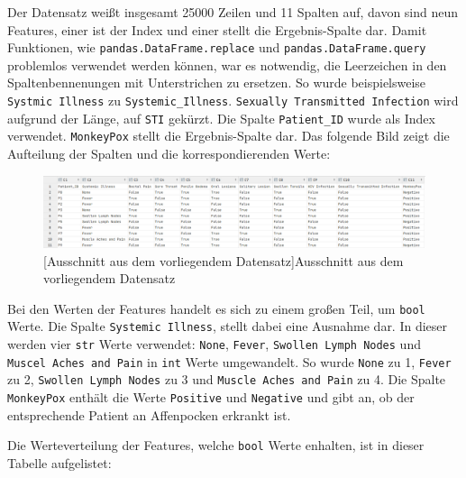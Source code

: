 \documentclass[13pt,a4paper, listof=entryprefix, bibliography=totocnumbered,toc=listofnumbered,lof=listofnumbered]{scrartcl}
\begin{document}
	Der Datensatz weißt insgesamt 25000 Zeilen und 11 Spalten auf, davon sind 
	neun Features, einer ist der Index und einer stellt die Ergebnis-Spalte dar. Damit Funktionen, wie \lstinline{pandas.DataFrame.replace} und 
	\lstinline{pandas.DataFrame.query} problemlos verwendet werden können, war es notwendig, die Leerzeichen in den Spaltenbennenungen mit Unterstrichen zu ersetzen. 
	So wurde beispielsweise \lstinline{Systmic Illness} zu \lstinline{Systemic_Illness}. \lstinline{Sexually Transmitted Infection} wird aufgrund der Länge, auf
	\lstinline{STI} gekürzt. Die Spalte \lstinline{Patient_ID} wurde als Index verwendet. 
	\lstinline{MonkeyPox} stellt die Ergebnis-Spalte dar. Das folgende Bild zeigt die Aufteilung der Spalten und die korrespondierenden Werte:

	\begin{figure}[H]
		\centering
		\includegraphics[width=0.8\linewidth]{Bilder/data_table.png}
		[Ausschnitt aus dem vorliegendem Datensatz]{Ausschnitt aus dem vorliegendem Datensatz}
		\label{fig:data_table}
	\end{figure}

	Bei den Werten der Features handelt es sich zu einem großen Teil, um \lstinline{bool} Werte. Die Spalte \lstinline{Systemic Illness}, stellt dabei eine Ausnahme dar. In dieser werden
	vier \lstinline{str} Werte verwendet: \lstinline{None}, \lstinline{Fever}, \lstinline{Swollen Lymph Nodes} und \lstinline{Muscel Aches and Pain} in \lstinline{int} Werte umgewandelt. So wurde \lstinline{None} zu 1,
	\lstinline{Fever} zu 2, \lstinline{Swollen Lymph Nodes} zu 3 und \lstinline{Muscle Aches and Pain} zu 4. Die Spalte \lstinline{MonkeyPox} enthält die Werte \lstinline{Positive} und \lstinline{Negative} und gibt
	an, ob der entsprechende Patient an Affenpocken erkrankt ist.

	Die Werteverteilung der Features, welche \lstinline{bool} Werte enhalten, ist in dieser Tabelle aufgelistet: 
	
\end{document}
